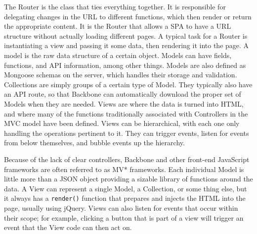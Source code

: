 \documentclass[12pt]{article}
\newcommand{\code}[1]{{\texttt {#1}}}
\begin{document}
The Router is the class that ties everything together. It is responsible for delegating changes in the URL to different functions, which then render or return the appropriate content. It is the Router that allows a SPA to have a URL structure without actually loading different pages. A typical task for a Router is instantiating a view and passing it some data, then rendering it into the page. A model is the raw data structure of a certain object. Models can have fields, functions, and API information, among other things.  Models are also defined as Mongoose schemas on the server, which handles their storage and validation. Collections are simply groups of a certain type of Model. They typically also have an API route, so that Backbone can automatically download the proper set of Models when they are needed. Views are where the data is turned into HTML, and where many of the functions traditionally associated with Controllers in the MVC model have been defined. Views can be hierarchical, with each one only handling the operations pertinent to it. They can trigger events, listen for events from below themselves, and bubble events up the hierarchy. 

Because of the lack of clear controllers, Backbone and other front-end JavaScript frameworks are often referred to as MV* frameworks. Each individual Model is little more than a JSON object providing a sizable library of functions around the data. A View can represent a single Model, a Collection, or some thing else, but it always has a \code{render()} function that prepares and injects the HTML into the page, usually using jQuery. Views can also listen for events that occur within their scope; for example, clicking a button that is part of a view will trigger an event that the View code can then act on. 
\end{document}
